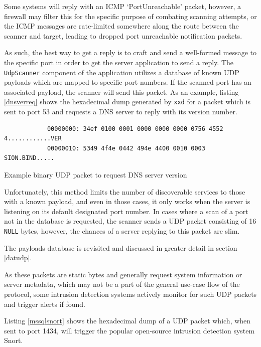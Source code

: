 \documentclass[a4paper,12pt]{article}
\begin{document}
	Some systems will reply with an ICMP `PortUnreachable' packet, however, a firewall may filter this for the specific purpose of combating scanning attempts, or the ICMP messages are rate-limited somewhere along the route between the scanner and target, leading to dropped port unreachable notification packets.
	
	As such, the best way to get a reply is to craft and send a well-formed message to the specific port in order to get the server application to send a reply. The \texttt{UdpScanner} component of the application utilizes a database of known UDP payloads which are mapped to specific port numbers. If the scanned port has an associated payload, the scanner will send this packet. As an example, listing \ref{dnsverreq} shows the hexadecimal dump generated by \texttt{xxd} for a packet which is sent to port 53 and requests a DNS server to reply with its version number.

	\begin{listing}[H]
		\begin{verbatim}
			00000000: 34ef 0100 0001 0000 0000 0000 0756 4552  4............VER
			00000010: 5349 4f4e 0442 494e 4400 0010 0003       SION.BIND.....
		\end{verbatim}
		\caption{Example binary UDP packet to request DNS server version}
		\label{dnsverreq}
	\end{listing}
	
	Unfortunately, this method limits the number of discoverable services to those with a known payload, and even in those cases, it only works when the server is listening on its default designated port number. In cases where a scan of a port not in the database is requested, the scanner sends a UDP packet consisting of 16 \texttt{NULL} bytes, however, the chances of a server replying to this packet are slim.
	
	The payloads database is revisited and discussed in greater detail in section \ref{datudp}.
	
	As these packets are static bytes and generally request system information or server metadata, which may not be a part of the general use-case flow of the protocol, some intrusion detection systems actively monitor for such UDP packets and trigger alerts if found.
	
	Listing \ref{mssqlsnort} shows the hexadecimal dump of a UDP packet which, when sent to port 1434, will trigger the popular open-source intrusion detection system Snort\cite{snort49}.
	
\end{document}
